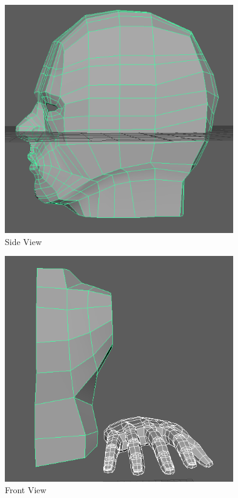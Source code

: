 \documentclass[a4paper]{article}
\begin{document}
\begin{figure}[h]
\centering
\includegraphics[width=10cm]{img/Side.png}
\caption{Side View}
\label{fig:Side View}
\end{figure}


\begin{figure}[h]
\centering
\includegraphics[width=10cm]{img/Front1.png}
\caption{Front View}
\label{fig:Front View}
\end{figure}
\end{document}
